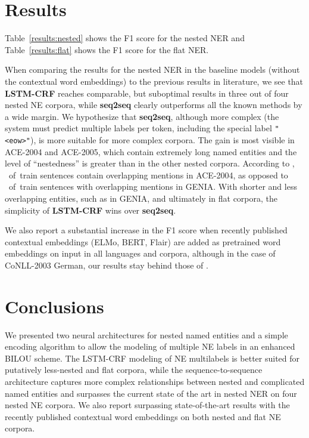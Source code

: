 \documentclass[11pt,a4paper]{article}
\begin{document}
\section{Results}
\label{section:results}

Table~\ref{results:nested} shows the F1 score for the nested NER and
Table~\ref{results:flat} shows the F1 score for the flat NER.

When comparing the results for the nested NER in the baseline models (without the
contextual word embeddings) to the previous results in literature, we see that
\textbf{LSTM-CRF} reaches comparable, but suboptimal results in three out of
four nested NE corpora, while \textbf{seq2seq} clearly outperforms all the
known methods by a wide margin. We hypothesize that \textbf{seq2seq}, although
more complex (the system must predict multiple labels per token, including the
special label \texttt{"<eow>"}), is more suitable for more complex corpora. The
gain is most visible in ACE-2004 and ACE-2005, which contain extremely long
named entities and the level of ``nestedness'' is greater than in the other
nested corpora. According to \citet{Wang2018}, ~of~train sentences contain
overlapping mentions in ACE-2004, as opposed to ~of~train sentences with
overlapping mentions in GENIA. With shorter and less overlapping entities, such
as in GENIA, and ultimately in flat corpora, the simplicity of
\textbf{LSTM-CRF} wins over \textbf{seq2seq}.

We also report a substantial increase in the F1 score when recently published
contextual embeddings (ELMo, BERT, Flair) are added as pretrained word embeddings on input
\cite{Peters2018,BERT,Akbik} in all languages and corpora, although in the case of
CoNLL-2003 German, our results stay behind those of \citet{Akbik}.

\section{Conclusions}

We presented two neural architectures for nested named entities and a simple
encoding algorithm to allow the modeling of multiple NE labels in an enhanced
BILOU scheme. The LSTM-CRF modeling of NE multilabels is better suited for
putatively less-nested and flat corpora, while the sequence-to-sequence
architecture captures more complex relationships between nested and complicated
named entities and surpasses the current state of the art in nested NER on four
nested NE corpora. We also report surpassing state-of-the-art results with the recently published contextual word embeddings on both nested and flat NE corpora.
\end{document}
